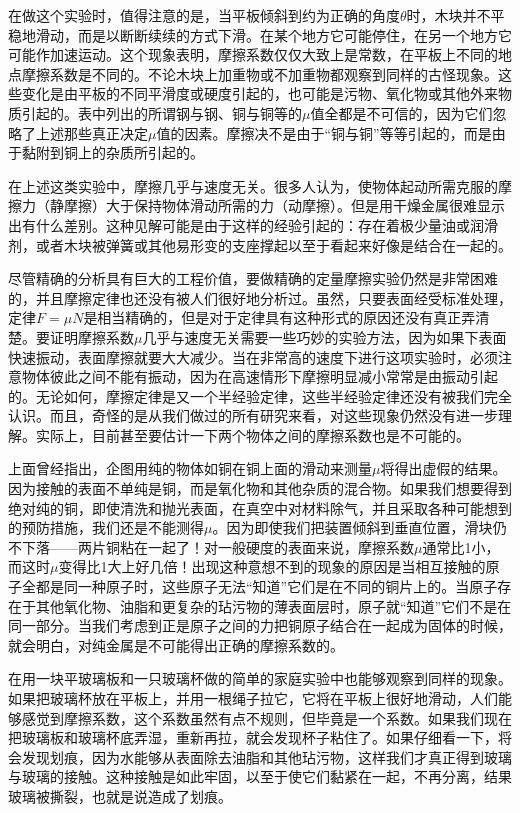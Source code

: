 在做这个实验时，值得注意的是，当平板倾斜到约为正确的角度$\theta$时，木块并不平稳地滑动，而是以断断续续的方式下滑。在某个地方它可能停住，在另一个地方它可能作加速运动。这个现象表明，摩擦系数仅仅大致上是常数，在平板上不同的地点摩擦系数是不同的。不论木块上加重物或不加重物都观察到同样的古怪现象。这些变化是由平板的不同平滑度或硬度引起的，也可能是污物、氧化物或其他外来物质引起的。表中列出的所谓钢与钢、铜与铜等的$\mu$值全都是不可信的，因为它们忽略了上述那些真正决定$\mu$值的因素。摩擦决不是由于“铜与铜”等等引起的，而是由于黏附到铜上的杂质所引起的。

在上述这类实验中，摩擦几乎与速度无关。很多人认为，使物体起动所需克服的摩擦力（静摩擦）大于保持物体滑动所需的力（动摩擦）。但是用干燥金属很难显示出有什么差别。这种见解可能是由于这样的经验引起的：存在着极少量油或润滑剂，或者木块被弹簧或其他易形变的支座撑起以至于看起来好像是结合在一起的。

尽管精确的分析具有巨大的工程价值，要做精确的定量摩擦实验仍然是非常困难的，并且摩擦定律也还没有被人们很好地分析过。虽然，只要表面经受标准处理，定律$F=\mu N$是相当精确的，但是对于定律具有这种形式的原因还没有真正弄清楚。要证明摩擦系数$\mu$几乎与速度无关需要一些巧妙的实验方法，因为如果下表面快速振动，表面摩擦就要大大减少。当在非常高的速度下进行这项实验时，必须注意物体彼此之间不能有振动，因为在高速情形下摩擦明显减小常常是由振动引起的。无论如何，摩擦定律是又一个半经验定律，这些半经验定律还没有被我们完全认识。而且，奇怪的是从我们做过的所有研究来看，对这些现象仍然没有进一步理解。实际上，目前甚至要估计一下两个物体之间的摩擦系数也是不可能的。

上面曾经指出，企图用纯的物体如铜在铜上面的滑动来测量$\mu$将得出虚假的结果。因为接触的表面不单纯是铜，而是氧化物和其他杂质的混合物。如果我们想要得到绝对纯的铜，即使清洗和抛光表面，在真空中对材料除气，并且采取各种可能想到的预防措施，我们还是不能测得$\mu$。因为即使我们把装置倾斜到垂直位置，滑块仍不下落——两片铜粘在一起了！对一般硬度的表面来说，摩擦系数$\mu$通常比1小，而这时$\mu$变得比1大上好几倍！出现这种意想不到的现象的原因是当相互接触的原子全都是同一种原子时，这些原子无法“知道”它们是在不同的铜片上的。当原子存在于其他氧化物、油脂和更复杂的玷污物的薄表面层时，原子就“知道”它们不是在同一部分。当我们考虑到正是原子之间的力把铜原子结合在一起成为固体的时候，就会明白，对纯金属是不可能得出正确的摩擦系数的。

在用一块平玻璃板和一只玻璃杯做的简单的家庭实验中也能够观察到同样的现象。如果把玻璃杯放在平板上，并用一根绳子拉它，它将在平板上很好地滑动，人们能够感觉到摩擦系数，这个系数虽然有点不规则，但毕竟是一个系数。如果我们现在把玻璃板和玻璃杯底弄湿，重新再拉，就会发现杯子粘住了。如果仔细看一下，将会发现划痕，因为水能够从表面除去油脂和其他玷污物，这样我们才真正得到玻璃与玻璃的接触。这种接触是如此牢固，以至于使它们黏紧在一起，不再分离，结果玻璃被撕裂，也就是说造成了划痕。

